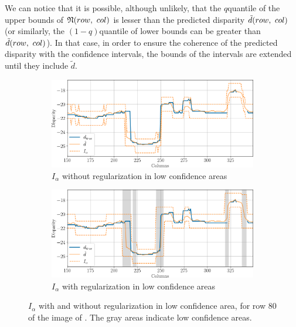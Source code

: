 We can notice that it is possible, although unlikely, that the $q$\ith quantile of the upper bounds of $\mathfrak{N}(row, ~col)$ is lesser than the predicted disparity $\tilde{d}(row, ~col)$ (or similarly, the $(1-q)$\ith quantile of lower bounds can be greater than $\tilde{d}(row, ~col)$). In that case, in order to ensure the coherence of the predicted disparity with the confidence intervals, the bounds of the intervals are extended until they include $\tilde{d}$.
\begin{figure}
    \centering
    \begin{subfigure}[t]{\linewidth}
        \centering
        \includegraphics[width=\linewidth]{Images/Chap_5/intervals_ambiguous_area_row_80_1.png}
        \caption{$I_\alpha$ without regularization in low confidence areas}
        \label{fig:intervals_ambiguous_row_80_1}
    \end{subfigure}\hfill
    \begin{subfigure}[t]{\linewidth}
        \centering
        \includegraphics[width=\linewidth]{Images/Chap_5/intervals_ambiguous_area_row_80_2.png}
        \caption{$I_\alpha$ with regularization in low confidence areas}
        \label{fig:intervals_ambiguous_row_80_2}
    \end{subfigure}
    \caption{$I_\alpha$ with and without regularization in low confidence area, for row $80$ of the image of . The gray areas indicate low confidence areas.}
    \label{fig:intervals_ambiguous_row_80}
\end{figure}


